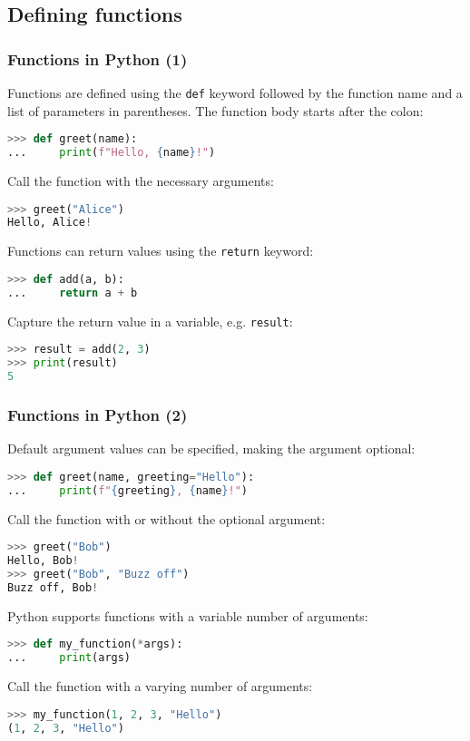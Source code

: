 \subsection{Defining functions}
\begin{frame}[fragile]
  \frametitle{Functions in Python (1)}
  Functions are defined using the \lstinline{def} keyword followed by the function name and a list of parameters in parentheses. The function body starts after the colon:
  \begin{lstlisting}[language=Python, numbers=none]
>>> def greet(name):
...     print(f"Hello, {name}!")
  \end{lstlisting}\pause
  Call the function with the necessary arguments:
  \begin{lstlisting}[language=Python, numbers=none]
>>> greet("Alice")
Hello, Alice!
  \end{lstlisting}\pause
  Functions can return values using the \lstinline{return} keyword:
  \begin{lstlisting}[language=Python, numbers=none]
>>> def add(a, b):
...     return a + b
  \end{lstlisting}\pause
  Capture the return value in a variable, e.g. \lstinline|result|:
  \begin{lstlisting}[language=Python, numbers=none]
>>> result = add(2, 3)
>>> print(result)
5
  \end{lstlisting}
\end{frame}

\begin{frame}[fragile]
  \frametitle{Functions in Python (2)}
  Default argument values can be specified, making the argument optional:
  \begin{lstlisting}[language=Python, numbers=none]
>>> def greet(name, greeting="Hello"):
...     print(f"{greeting}, {name}!")
  \end{lstlisting}\pause
  Call the function with or without the optional argument:
  \begin{lstlisting}[language=Python, numbers=none]
>>> greet("Bob")
Hello, Bob!
>>> greet("Bob", "Buzz off")
Buzz off, Bob!
  \end{lstlisting}\pause
  Python supports functions with a variable number of arguments:
  \begin{lstlisting}[language=Python, numbers=none]
>>> def my_function(*args):
...     print(args)
  \end{lstlisting}\pause
  Call the function with a varying number of arguments:
  \begin{lstlisting}[language=Python, numbers=none]
>>> my_function(1, 2, 3, "Hello")
(1, 2, 3, "Hello")
  \end{lstlisting}
\end{frame}

